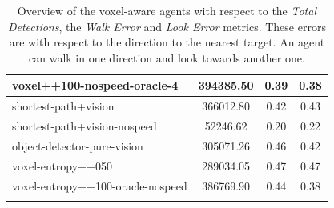 \begin{longtable}{|l|c|c|c|}
voxel++100-nospeed-oracle-4 & 394385.50 & {\cellcolor[HTML]{BADAD4}} \color[HTML]{000000} 0.39 & {\cellcolor[HTML]{B4D8D0}} \color[HTML]{000000} 0.38 \\ \hline
shortest-path+vision & 366012.80 & {\cellcolor[HTML]{CCE3DE}} \color[HTML]{000000} 0.42 & {\cellcolor[HTML]{D2E6E2}} \color[HTML]{000000} 0.43 \\ \hline
shortest-path+vision-nospeed & 52246.62 & {\cellcolor[HTML]{55AA99}} \color[HTML]{000000} 0.20 & {\cellcolor[HTML]{55AA99}} \color[HTML]{000000} 0.22 \\ \hline
object-detector-pure-vision & 305071.26 & {\cellcolor[HTML]{DEECE9}} \color[HTML]{000000} 0.46 & {\cellcolor[HTML]{C9E2DC}} \color[HTML]{000000} 0.42 \\ \hline
voxel-entropy++050 & 289034.05 & {\cellcolor[HTML]{E3EFEC}} \color[HTML]{000000} 0.47 & {\cellcolor[HTML]{E7F0EE}} \color[HTML]{000000} 0.47 \\ \hline
voxel-entropy++100-oracle-nospeed & 386769.90 & {\cellcolor[HTML]{D5E8E4}} \color[HTML]{000000} 0.44 & {\cellcolor[HTML]{B6D8D1}} \color[HTML]{000000} 0.38 \\ \hline

    \caption{Overview of the voxel-aware agents with respect to the \textit{Total Detections}, the \textit{Walk Error} and \textit{Look Error} metrics.
    These errors are with respect to the direction to the nearest target. An agent can walk in one direction and look towards another one.
    }
    \label{tab:results-RQ1-walkLook}
\end{longtable}

